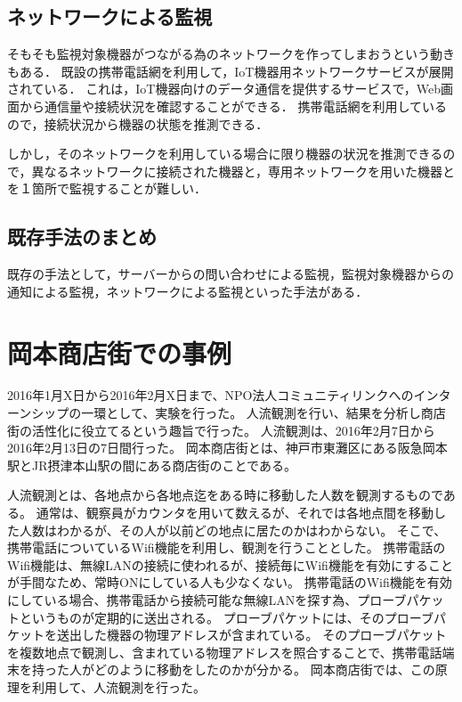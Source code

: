\subsection{ネットワークによる監視}
	そもそも監視対象機器がつながる為のネットワークを作ってしまおうという動きもある．
	既設の携帯電話網を利用して，IoT機器用ネットワークサービスが展開されている．
	これは，IoT機器向けのデータ通信を提供するサービスで，Web画面から通信量や接続状況を確認することができる．
	携帯電話網を利用しているので，接続状況から機器の状態を推測できる．

	しかし，そのネットワークを利用している場合に限り機器の状況を推測できるので，異なるネットワークに接続された機器と，専用ネットワークを用いた機器とを１箇所で監視することが難しい．

\subsection{既存手法のまとめ}
	既存の手法として，サーバーからの問い合わせによる監視，監視対象機器からの通知による監視，ネットワークによる監視といった手法がある．







\section{岡本商店街での事例}
2016年1月X日から2016年2月X日まで、NPO法人コミュニティリンクへのインターンシップの一環として、実験を行った。
人流観測を行い、結果を分析し商店街の活性化に役立てるという趣旨で行った。
人流観測は、2016年2月7日から2016年2月13日の7日間行った。
岡本商店街とは、神戸市東灘区にある阪急岡本駅とJR摂津本山駅の間にある商店街のことである。

人流観測とは、各地点から各地点迄をある時に移動した人数を観測するものである。
通常は、観察員がカウンタを用いて数えるが、それでは各地点間を移動した人数はわかるが、その人が以前どの地点に居たのかはわからない。
そこで、携帯電話についているWifi機能を利用し、観測を行うこととした。
携帯電話のWifi機能は、無線LANの接続に使われるが、接続毎にWifi機能を有効にすることが手間なため、常時ONにしている人も少なくない。
携帯電話のWifi機能を有効にしている場合、携帯電話から接続可能な無線LANを探す為、プローブパケットというものが定期的に送出される。
プローブパケットには、そのプローブパケットを送出した機器の物理アドレスが含まれている。
そのプローブパケットを複数地点で観測し、含まれている物理アドレスを照合することで、携帯電話端末を持った人がどのように移動をしたのかが分かる。
岡本商店街では、この原理を利用して、人流観測を行った。

